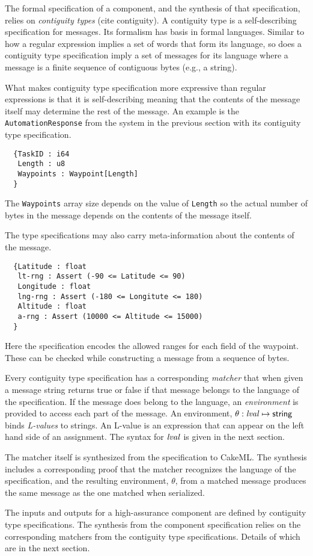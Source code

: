 The formal specification of a component, and the synthesis of that specification, relies on \emph{contiguity types} (cite contiguity). A contiguity type is a self-describing specification for messages. Its formalism has basis in formal languages. Similar to how a regular expression implies a set of words that form its language, so does a contiguity type specification imply a set of messages for its language where a message is a finite sequence of contiguous bytes (e.g., a string). 

What makes contiguity type specification more expressive than regular expressions is that it is self-describing meaning that the contents of the message itself may determine the rest of the message. An example is the \texttt{AutomationResponse} from the system in the previous section with its contiguity type specification.
{\small
\begin{verbatim}
  {TaskID : i64
   Length : u8
   Waypoints : Waypoint[Length]
  }
\end{verbatim}
}
\noindent The \texttt{Waypoints} array size depends on the value of \texttt{Length} so the actual number of bytes in the message depends on the contents of the message itself. 

The type specifications may also carry meta-information about the contents of the message.
{\small
\begin{verbatim}
  {Latitude : float
   lt-rng : Assert (-90 <= Latitude <= 90) 
   Longitude : float
   lng-rng : Assert (-180 <= Longitute <= 180)
   Altitude : float
   a-rng : Assert (10000 <= Altitude <= 15000)
  }
\end{verbatim}
}
\noindent Here the specification encodes the allowed ranges for each field of the waypoint. These can be checked while constructing a message from a sequence of bytes.

Every contiguity type specification has a corresponding \emph{matcher} that when given a message string returns true or false if that message belongs to the language of the specification. If the message does belong to the language, an \emph{environment} is provided to access each part of the message. An environment, $\theta: \mathit{lval} \mapsto \mathsf{string}$ binds \emph{L-values} to strings. An L-value is an expression that can appear on the left hand side of an assignment. The syntax for $\mathit{lval}$ is given in the next section.

The matcher itself is synthesized from the specification to CakeML. The synthesis includes a corresponding proof that the matcher recognizes the language of the specification, and the resulting environment, $\theta$, from a matched message produces the same message as the one matched when serialized. 

The inputs and outputs for a high-assurance component are defined by contiguity type specifications. The synthesis from the component specification relies on the corresponding matchers from the contiguity type specifications. Details of which are in the next section.
